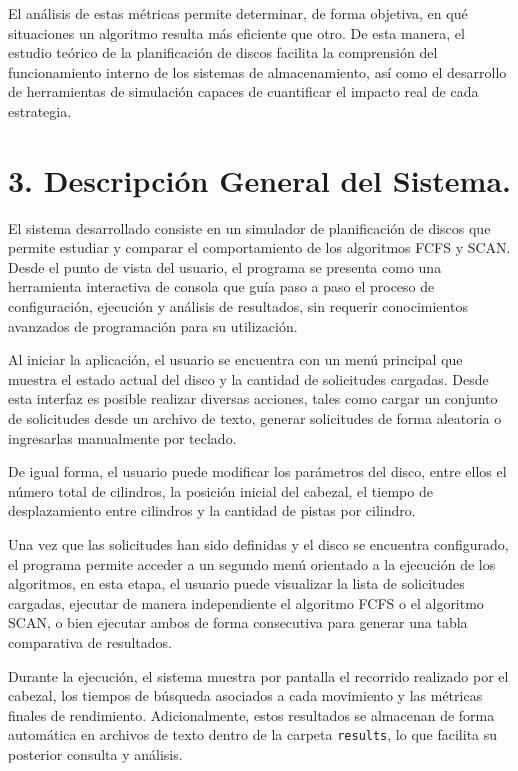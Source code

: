 \documentclass[14pt,letterpaper]{extarticle}
\begin{document}
El análisis de estas métricas permite determinar, de forma objetiva, en qué situaciones un algoritmo resulta más eficiente que otro. De esta manera, el estudio teórico de la planificación de discos facilita la comprensión del funcionamiento interno de los sistemas de almacenamiento, así como el desarrollo de herramientas de simulación capaces de cuantificar el impacto real de cada estrategia.

\vfill

\section*{3. Descripción General del Sistema.}

El sistema desarrollado consiste en un simulador de planificación de discos que permite estudiar y comparar el comportamiento de los algoritmos FCFS y SCAN. Desde el punto de vista del usuario, el programa se presenta como una herramienta interactiva de consola que guía paso a paso el proceso de configuración, ejecución y análisis de resultados, sin requerir conocimientos avanzados de programación para su utilización.

Al iniciar la aplicación, el usuario se encuentra con un menú principal que muestra el estado actual del disco y la cantidad de solicitudes cargadas. Desde esta interfaz es posible realizar diversas acciones, tales como cargar un conjunto de solicitudes desde un archivo de texto, generar solicitudes de forma aleatoria o ingresarlas manualmente por teclado.

De igual forma, el usuario puede modificar los parámetros del disco, entre ellos el número total de cilindros, la posición inicial del cabezal, el tiempo de desplazamiento entre cilindros y la cantidad de pistas por cilindro.

Una vez que las solicitudes han sido definidas y el disco se encuentra configurado, el programa permite acceder a un segundo menú orientado a la ejecución de los algoritmos, en esta etapa, el usuario puede visualizar la lista de solicitudes cargadas, ejecutar de manera independiente el algoritmo FCFS o el algoritmo SCAN, o bien ejecutar ambos de forma consecutiva para generar una tabla comparativa de resultados.

Durante la ejecución, el sistema muestra por pantalla el recorrido realizado por el cabezal, los tiempos de búsqueda asociados a cada movimiento y las métricas finales de rendimiento. Adicionalmente, estos resultados se almacenan de forma automática en archivos de texto dentro de la carpeta \texttt{results}, lo que facilita su posterior consulta y análisis.
\end{document}
